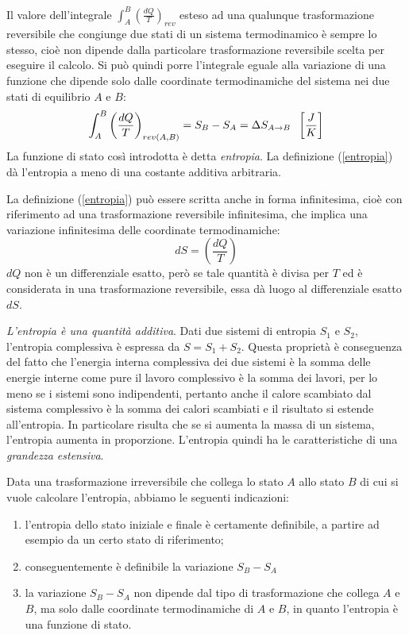 \documentclass[class=book, crop=false, oneside, 12pt]{standalone}
\begin{document}
Il valore dell'integrale \(\int_A^B \left(\frac{d Q}{T}\right)_{rev}\) esteso ad una qualunque trasformazione reversibile che congiunge due stati di un sistema termodinamico è sempre lo stesso, cioè non dipende dalla particolare trasformazione reversibile scelta per eseguire il calcolo. \newline
Si può quindi porre l'integrale eguale alla variazione di una funzione che dipende solo dalle coordinate termodinamiche del sistema nei due stati di equilibrio \(A\) e \(B\):
\begin{equation} \label{entropia}
    \int_A^B \left(\frac{d Q}{T}\right)_{rev(A, B)} = S_{B} - S_{A} = \Delta S_{A\rightarrow B} \hspace{0.2cm} \left[\frac{J}{K}\right]
\end{equation}
La funzione di stato così introdotta è detta \emph{entropia}.\newline
La definizione (\ref{entropia}) dà l'entropia a meno di una costante additiva arbitraria.

La definizione (\ref{entropia}) può essere scritta anche in forma infinitesima, cioè con riferimento ad una trasformazione reversibile infinitesima, che implica una variazione infinitesima delle coordinate termodinamiche:
\begin{equation} \label{entropia_infinitesima}
    d S = \left(\frac{dQ}{T}\right)
\end{equation}
\(d Q\) non è un differenziale esatto, però se tale quantità è divisa per \(T\) ed è considerata in una trasformazione reversibile, essa dà luogo al differenziale esatto \(d S\).

\emph{L'entropia è una quantità additiva}. Dati due sistemi di entropia \(S_1\) e \(S_2\), l'entropia complessiva è espressa da \(S = S_1 + S_2\).
Questa proprietà è conseguenza del fatto che l'energia interna complessiva dei due sistemi è la somma delle energie interne come pure il lavoro complessivo è la somma dei lavori, per lo meno se i sistemi sono indipendenti, pertanto anche il calore scambiato dal sistema complessivo è la somma dei calori scambiati e il risultato si estende all'entropia.
In particolare risulta che se si aumenta la massa di un sistema, l'entropia aumenta in proporzione.
L'entropia quindi ha le caratteristiche di una \emph{grandezza estensiva}.

Data una trasformazione irreversibile che collega lo stato \(A\) allo stato \(B\) di cui si vuole calcolare l'entropia, abbiamo le seguenti indicazioni:
\begin{enumerate}
    \item l'entropia dello stato iniziale e finale è certamente definibile, a partire ad esempio da un certo stato di riferimento; 
    \item conseguentemente è definibile la variazione \(S_B - S_A\) 
    \item la variazione \(S_B - S_A\) non dipende dal tipo di trasformazione che collega \(A\) e \(B\), ma solo dalle coordinate termodinamiche di \(A\) e \(B\), in quanto l'entropia è una funzione di stato. 
\end{enumerate}
\end{document}
